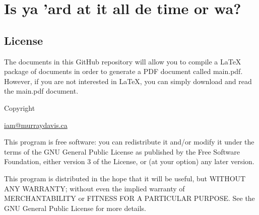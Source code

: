 \chapter{Is ya 'ard at it all de time or wa?}
\label{ch:intro}
\pagestyle{fancy}

\fancyhf{} %
\fancyhead[OC]{\leftmark} %
\setlength{\headheight}{13.99pt} 
\cfoot{\thepage} %

		

\section{License}

The documents in this GitHub repository will allow you to compile a LaTeX package of documents in order to generate a PDF document called main.pdf. However, if you are not interested in LaTeX, you can simply download and read the main.pdf document.

Copyright  \author{Murray Davis} \href{mailto:iam@murraydavis.ca}{iam@murraydavis.ca}

This program is free software: you can redistribute it and/or modify
it under the terms of the GNU General Public License as published by
the Free Software Foundation, either version 3 of the License, or
(at your option) any later version.

This program is distributed in the hope that it will be useful,
but WITHOUT ANY WARRANTY; without even the implied warranty of
MERCHANTABILITY or FITNESS FOR A PARTICULAR PURPOSE.  See the
GNU General Public License for more details.

